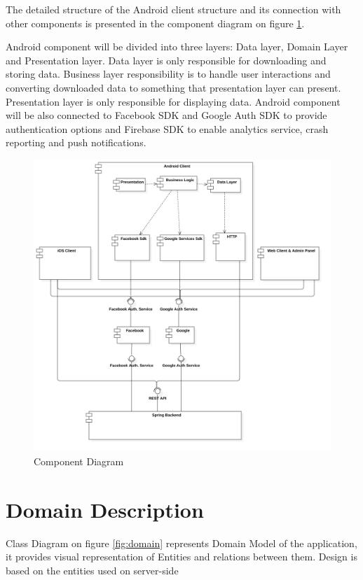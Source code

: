 \documentclass[thesis=B,english]{FITthesis}[2012/10/20]
\begin{document}
The detailed structure of the Android client structure and its connection with other components is presented in the component diagram on figure \ref{fig:deploy}. 

 Android component will be divided into three layers: Data layer, Domain Layer and Presentation layer. Data layer is only responsible for downloading and storing data. Business layer responsibility is to handle user interactions and converting downloaded data to something that presentation layer can present. Presentation layer is only responsible for displaying data. Android component will be also connected to Facebook SDK and Google Auth SDK to provide authentication options and Firebase SDK to enable analytics service, crash reporting and push notifications.
\newpage
\begin{figure}[H]
  \includegraphics[scale=0.4]{deployment}
  \caption{Component Diagram}
  \label{fig:deploy}
\end{figure}


\newpage
\section{Domain Description}
 Class Diagram on figure \ref{fig:domain} represents Domain Model of the application, it provides visual representation of Entities and relations between them. Design is based on the entities used on server-side
\end{document}
